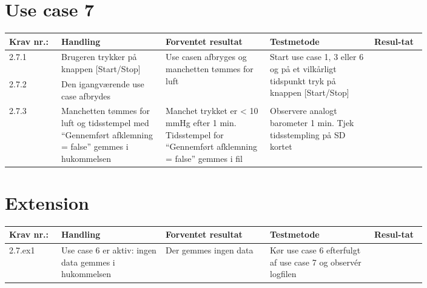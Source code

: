 \section{Use case 7}
						\begin{longtable}{|p{0.1\linewidth}|p{0.2\linewidth}|p{0.2\linewidth}|p{0.2\linewidth}|p{0.1\linewidth}|}
							\hline
							Krav nr.: & Handling & Forventet resultat & Testmetode & Resul-tat  \\\hline
							2.7.1 & Brugeren trykker på knappen [Start/Stop] & \multirow{2}{\linewidth}{Use casen afbryges og manchetten tømmes for luft} & \multirow{2}{\linewidth}{Start use case 1, 3 eller 6 og på et vilkårligt tidspunkt tryk på knappen [Start/Stop]} & \multirow{2}{\linewidth}{} \\ \cline{1-2}
							2.7.2 & Den igangværende use case afbrydes & & & \\ \hline
							2.7.3 & Manchetten tømmes for luft og tidsstempel med “Gennemført afklemning = false” gemmes i hukommelsen & Manchet trykket er < 10 mmHg efter 1 min. Tidsstempel for  “Gennemført afklemning = false” gemmes i fil & Observere analogt barometer 1 min.
							Tjek tidsstempling på SD kortet & \\ \hline
						\end{longtable}
						
						\pagebreak
					
					\section*{Extension}
						\begin{longtable}{|p{0.1\linewidth}|p{0.2\linewidth}|p{0.2\linewidth}|p{0.2\linewidth}|p{0.1\linewidth}|}
							\hline
							Krav nr.: & Handling & Forventet resultat & Testmetode & Resul-tat  \\\hline
							2.7.ex1 & Use case 6 er aktiv: ingen data gemmes i hukommelsen & Der gemmes ingen data & Kør use case 6 efterfulgt af use case 7 og observér logfilen & \\ \hline
						\end{longtable}